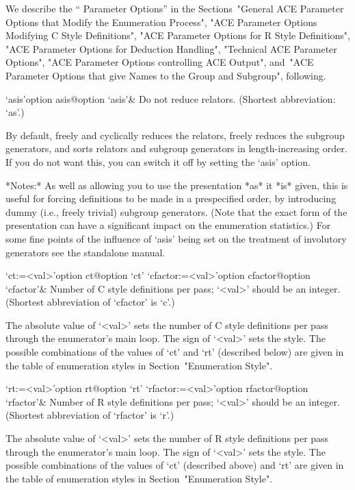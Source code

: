 We describe the ``{\ACE} Parameter Options'' in the  Sections~"General
ACE Parameter Options  that  Modify  the  Enumeration  Process",  "ACE
Parameter Options  Modifying  C  Style  Definitions",  "ACE  Parameter
Options for R Style Definitions", "ACE Parameter Options for Deduction
Handling", "Technical ACE Parameter Options", "ACE  Parameter  Options
controlling ACE Output", and~"ACE Parameter Options that give Names to
the Group and Subgroup", following.


\beginitems

\>`asis'{option asis}@{option `asis'}&
Do not reduce relators. (Shortest abbreviation: `as'.)

By default, {\ACE} freely  and cyclically reduces the relators, freely
reduces  the  subgroup generators,  and  sorts  relators and  subgroup
generators in length-increasing  order.  If you do not  want this, you
can switch it off by setting the `asis' option.

*Notes:* As well as allowing you  to use the presentation *as* it *is*
given,  this  is  useful for  forcing  definitions  to  be made  in  a
prespecified  order,  by  introducing  dummy  (i.e.,  freely  trivial)
subgroup generators.   (Note that the  exact form of  the presentation
can  have a significant  impact on  the enumeration  statistics.)  For
some fine points of the influence of `asis' being set on the treatment
of involutory generators see the {\ACE} standalone manual.

\>`ct:=<val>'{option ct}@{option `ct'}
\>`cfactor:=<val>'{option cfactor}@{option `cfactor'}&
Number of C style definitions per pass; `<val>' should be an  integer. 
(Shortest abbreviation of `cfactor' is `c'.)

The absolute value of `<val>' sets the number of C  style  definitions
per pass through the enumerator's main loop. The sign of `<val>'  sets
the style. The possible combinations of the values of  `ct'  and  `rt'
(described below) are given in the  table  of  enumeration  styles  in
Section~"Enumeration Style".

\>`rt:=<val>'{option rt}@{option `rt'}
\>`rfactor:=<val>'{option rfactor}@{option `rfactor'}&
Number of R style definitions per pass; `<val>' should be an  integer. 
(Shortest abbreviation of `rfactor' is `r'.)

The absolute value of `<val>' sets the number of R  style  definitions
per pass through the enumerator's main loop. The sign of `<val>'  sets
the style. The possible combinations of the values of `ct'  (described
above) and `rt' are given  in  the  table  of  enumeration  styles  in
Section~"Enumeration Style".

